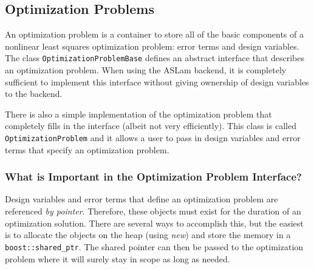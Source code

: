 \documentclass[11pt,a4,oneside]{article}
\newcommand{\txt}[1]{{\footnotesize\texttt{#1}}}
\newcommand{\listcpp}[2]{}
\begin{document}
\subsection{Optimization Problems \label{ss:OptimizationProblem}}
An optimization problem is a container to store all of the basic components of a nonlinear least squares optimization problem: error terms and design variables. The class \txt{OptimizationProblemBase} defines an abstract interface that describes an optimization problem. When using the ASLam backend, it is completely sufficient to implement this interface without giving ownership of design variables to the backend.

\listcpp{OptimizationProblemBase.hpp}{../../aslam_backend/include/aslam/backend/OptimizationProblemBase.hpp}

There is also a simple implementation of the optimization problem that completely fills in the interface (albeit not very efficiently). This class is called \txt{OptimizationProblem} and it allows a user to pass in design variables and error terms that specify an optimization problem.

\listcpp{OptimizationProblem.hpp}{../../aslam_backend/include/aslam/backend/OptimizationProblem.hpp}

\subsubsection{What is Important in the Optimization Problem Interface?}
Design variables and error terms that define an optimization problem are referenced {\em by pointer}. Therefore, these objects must exist for the duration of an optimization solution. There are several ways to accomplish this, but the easiest is to allocate the objects on the heap (using {\em new}) and store the memory in a \txt{boost::shared\_ptr}. The shared pointer can then be passed to the optimization problem where it will surely stay in scope as long as needed.
\end{document}
